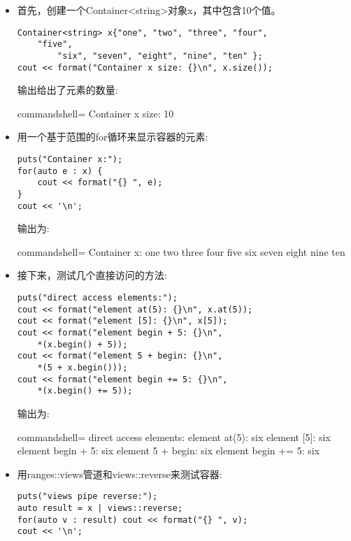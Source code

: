\begin{itemize}
\item 
首先，创建一个Container<string>对象x，其中包含10个值。

\begin{lstlisting}[style=styleCXX]
Container<string> x{"one", "two", "three", "four",
	"five",
		"six", "seven", "eight", "nine", "ten" };
cout << format("Container x size: {}\n", x.size());
\end{lstlisting}

输出给出了元素的数量:

\begin{tcblisting}{commandshell={}}
Container x size: 10
\end{tcblisting}

\item 
用一个基于范围的for循环来显示容器的元素:

\begin{lstlisting}[style=styleCXX]
puts("Container x:");
for(auto e : x) {
	cout << format("{} ", e);
}
cout << '\n';
\end{lstlisting}

输出为:

\begin{tcblisting}{commandshell={}}
Container x:
one two three four five six seven eight nine ten
\end{tcblisting}

\item 
接下来，测试几个直接访问的方法:

\begin{lstlisting}[style=styleCXX]
puts("direct access elements:");
cout << format("element at(5): {}\n", x.at(5));
cout << format("element [5]: {}\n", x[5]);
cout << format("element begin + 5: {}\n",
	*(x.begin() + 5));
cout << format("element 5 + begin: {}\n",
	*(5 + x.begin()));
cout << format("element begin += 5: {}\n",
	*(x.begin() += 5));
\end{lstlisting}

输出为:

\begin{tcblisting}{commandshell={}}
direct access elements:
element at(5): six
element [5]: six
element begin + 5: six
element 5 + begin: six
element begin += 5: six
\end{tcblisting}

\item 
用ranges::views管道和views::reverse来测试容器:

\begin{lstlisting}[style=styleCXX]
puts("views pipe reverse:");
auto result = x | views::reverse;
for(auto v : result) cout << format("{} ", v);
cout << '\n';
\end{lstlisting}


\end{itemize}
